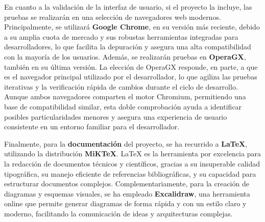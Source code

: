 En cuanto a la validación de la interfaz de usuario, si el proyecto la incluye, las pruebas se realizarán en una selección de navegadores web modernos. Principalmente, se utilizará \textbf{Google Chrome}, en su versión más reciente, debido a su amplia cuota de mercado y sus robustas herramientas integradas para desarrolladores, lo que facilita la depuración y asegura una alta compatibilidad con la mayoría de los usuarios. Además, se realizarán pruebas en \textbf{OperaGX}, también en su última versión. La elección de OperaGX responde, en parte, a que es el navegador principal utilizado por el desarrollador, lo que agiliza las pruebas iterativas y la verificación rápida de cambios durante el ciclo de desarrollo. Aunque ambos navegadores comparten el motor Chromium, permitiendo una base de compatibilidad similar, esta doble comprobación ayuda a identificar posibles particularidades menores y asegura una experiencia de usuario consistente en un entorno familiar para el desarrollador.

Finalmente, para la \textbf{documentación} del proyecto, se ha recurrido a \textbf{LaTeX}, utilizando la distribución \textbf{MiKTeX}. LaTeX es la herramienta por excelencia para la redacción de documentos técnicos y científicos, gracias a su insuperable calidad tipográfica, su manejo eficiente de referencias bibliográficas, y su capacidad para estructurar documentos complejos. Complementariamente, para la creación de diagramas y esquemas visuales, se ha empleado \textbf{Excalidraw}, una herramienta online que permite generar diagramas de forma rápida y con un estilo claro y moderno, facilitando la comunicación de ideas y arquitecturas complejas.

